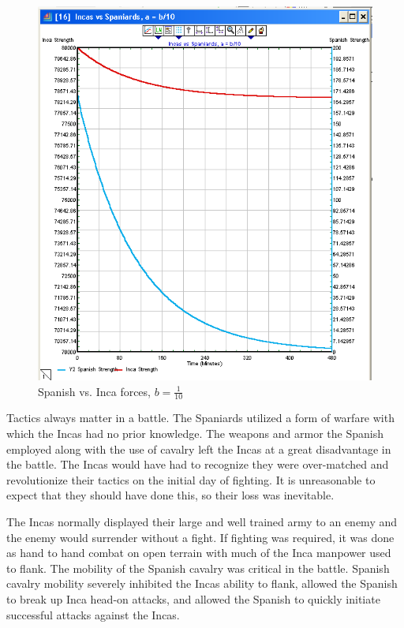 \documentclass[letterpaper,10pt]{article}
\begin{document}
\begin{figure}[h!tp]
\begin{center}
\includegraphics[scale=0.4]{fig3c.png}
\caption{Spanish vs. Inca forces, $b=\frac{1}{10}$}
\label{fig3c}
\end{center}
\end{figure}

Tactics always matter in a battle. The Spaniards utilized a form of warfare with which the Incas had no prior knowledge.  The weapons and armor the Spanish employed along with the use of cavalry left the Incas at a great disadvantage in the battle.  The Incas would have had to recognize they were over-matched and revolutionize their tactics on the initial day of fighting.  It is unreasonable to expect that they should have done this, so their loss was inevitable.

The Incas normally displayed their large and well trained army to an enemy and the enemy would surrender without a fight.  If fighting was required, it was done as hand to hand combat on open terrain with much of the Inca manpower used to flank. The mobility of the Spanish cavalry was critical in the battle.  Spanish cavalry mobility severely inhibited the Incas ability to flank, allowed the Spanish to break up Inca head-on attacks, and allowed the Spanish to quickly initiate successful attacks against the Incas.
\end{document}
